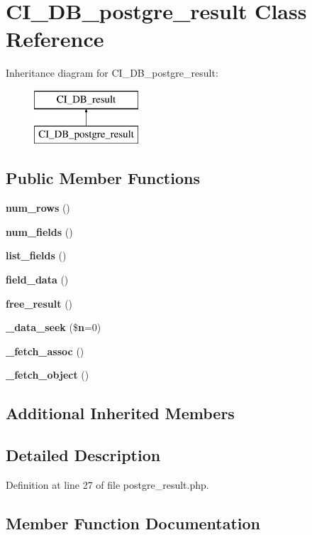 \section{C\-I\-\_\-\-D\-B\-\_\-postgre\-\_\-result Class Reference}
\label{class_c_i___d_b__postgre__result}
Inheritance diagram for C\-I\-\_\-\-D\-B\-\_\-postgre\-\_\-result\-:\begin{figure}[H]
\begin{center}
\leavevmode
\includegraphics[height=2.000000cm]{class_c_i___d_b__postgre__result}
\end{center}
\end{figure}
\subsection*{Public Member Functions}
\begin{DoxyCompactItemize}
\item 
{\bf num\-\_\-rows} ()
\item 
{\bf num\-\_\-fields} ()
\item 
{\bf list\-\_\-fields} ()
\item 
{\bf field\-\_\-data} ()
\item 
{\bf free\-\_\-result} ()
\item 
{\bf \-\_\-data\-\_\-seek} (\${\bf n}=0)
\item 
{\bf \-\_\-fetch\-\_\-assoc} ()
\item 
{\bf \-\_\-fetch\-\_\-object} ()
\end{DoxyCompactItemize}
\subsection*{Additional Inherited Members}


\subsection{Detailed Description}


Definition at line 27 of file postgre\-\_\-result.\-php.



\subsection{Member Function Documentation}
